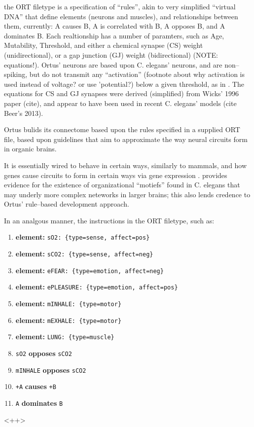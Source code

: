 \documentclass[letterpaper]{article}
\begin{document}
the ORT filetype is a specification of ``rules'', akin to very simplified ``virtual DNA'' that define elements (neurons and muscles), and relationships between them, currently: A causes B, A is correlated with B, A opposes B, and A dominates B. Each realtionship has a number of paramters, such as Age, Mutability, Threshold, and either a chemical synapse (CS) weight (unidirectional), or a gap junction (GJ) weight (bidirectional) (NOTE: equations!). Ortus' neurons are based upon C. elegans' neurons, and are non--spiking, but do not transmit any ``activation'' (footnote about why activation is used instead of voltage? or use 'potential?) below a given threshold, as in \citep{Graubard1014}. The equations for CS and GJ synapses were derived (simplified) from Wicks' 1996 paper (cite), and appear to have been used in recent C. elegans' models (cite Beer's 2013).


Ortus bulids its connectome based upon the rules specified in a supplied ORT file, based upon guidelines that aim to approximate the way neural circuits form in organic brains.

It is essentially wired to behave in certain ways, similarly to mammals, and how genes cause circuits to form in certain ways via gene expression \citep{MNCF:wiredforbehaviors}. 
\citet{Schroter2017} provides evidence for the existence of organizational ``motiefs'' found in C. elegans that may underly more complex neteworks in larger brains; this also lends credence to Ortus' rule--based development approach.

In an analgous manner, the instructions in the ORT filetype, such as:

\begin{enumerate}
    \item \textbf{element:} \texttt{sO2: \{type=sense, affect=pos\}}
    \item \textbf{element:} \texttt{sCO2: \{type=sense, affect=neg\}}
    \item \textbf{element:} \texttt{eFEAR: \{type=emotion, affect=neg\}}
    \item \textbf{element:} \texttt{ePLEASURE: \{type=emotion, affect=pos\}}
    \item \textbf{element:} \texttt{mINHALE: \{type=motor\}}
    \item \textbf{element:} \texttt{mEXHALE: \{type=motor\}}
    \item \textbf{element:} \texttt{LUNG: \{type=muscle\}}
    \item \texttt{sO2} \textbf{opposes} \texttt{sCO2}
    \item \texttt{mINHALE} \textbf{opposes} \texttt{sCO2}
    \item \texttt{+A} \textbf{causes} \texttt{+B}
    \item \texttt{A} \textbf{dominates} \texttt{B}
\end{enumerate}<++>
\end{document}
